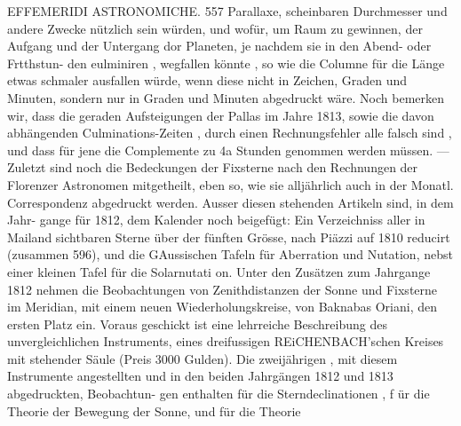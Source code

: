 \documentclass[12pt,a4paper]{article}
\begin{document}
\newpage
EFFEMERIDI ASTRONOMICHE. 557\newline
Parallaxe, scheinbaren Durchmesser und andere Zwecke nützlich sein würden, und wofür, um Raum zu\newline
gewinnen, der Aufgang und der Untergang dor Planeten, je nachdem sie in den Abend- oder Frtthstun-\newline
den eulminiren , wegfallen könnte , so wie die Columne für die Länge etwas schmaler ausfallen würde,\newline
wenn diese nicht in Zeichen, Graden und Minuten, sondern nur in Graden und Minuten abgedruckt\newline
wäre. Noch bemerken wir, dass die geraden Aufsteigungen der Pallas im Jahre 1813, sowie die davon\newline
abhängenden Culminations-Zeiten , durch einen Rechnungsfehler alle falsch sind , und dass für jene die\newline
Complemente zu 4a Stunden genommen werden müssen. --- Zuletzt sind noch die Bedeckungen der\newline
Fixsterne nach den Rechnungen der Florenzer Astronomen mitgetheilt, eben so, wie sie alljährlich auch\newline
in der Monatl. Correspondenz abgedruckt werden. Ausser diesen stehenden Artikeln sind, in dem Jahr-\newline
gange für 1812, dem Kalender noch beigefügt: Ein Verzeichniss aller in Mailand sichtbaren Sterne\newline
über der fünften Grösse, nach Piäzzi auf 1810 reducirt (zusammen 596), und die GAussischen Tafeln\newline
für Aberration und Nutation, nebst einer kleinen Tafel für die Solarnutati on.\newline
Unter den Zusätzen zum Jahrgange 1812 nehmen die Beobachtungen von Zenithdistanzen der Sonne\newline
und Fixsterne im Meridian, mit einem neuen Wiederholungskreise, von Baknabas Oriani, den ersten\newline
Platz ein. Voraus geschickt ist eine lehrreiche Beschreibung des unvergleichlichen Instruments, eines\newline
dreifussigen REiCHENBACH'schen Kreises mit stehender Säule (Preis 3000 Gulden). Die zweijährigen , mit\newline
diesem Instrumente angestellten und in den beiden Jahrgängen 1812 und 1813 abgedruckten, Beobachtun-\newline
gen enthalten für die Sterndeclinationen , f ür die Theorie der Bewegung der Sonne, und für die Theorie\newline
\end{document}

